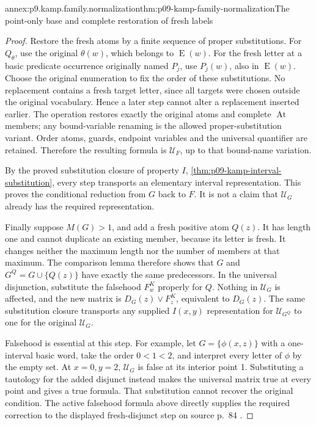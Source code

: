 \begin{annexitem}{annex:p9.kamp.family.normalization}{thm:p09-kamp-family-normalization}{The point-only base and complete restoration of fresh labels}
\begin{proof}
Restore the fresh atoms by a finite sequence of proper substitutions.
For \(Q_\theta\), use the original \(\theta(w)\), which
belongs to \(\operatorname{E}(w)\). For the fresh letter at
a basic predicate occurrence originally named \(P_j\), use
\(P_j(w)\), also in \(\operatorname{E}(w)\). Choose the
original enumeration to fix the order of these substitutions.
No replacement contains a fresh target letter, since all targets were
chosen outside the original vocabulary. Hence a later step cannot
alter a replacement inserted earlier. The operation restores exactly
the original atoms and complete \(\operatorname{At}\) members;
any bound-variable renaming is the allowed proper-substitution variant.
Order atoms, guards, endpoint variables and the universal quantifier
are retained. Therefore the resulting formula is
\(\mathcal U_F\), up to that bound-name variation.

By the proved substitution closure of property \(I\),
\cref{thm:p09-kamp-interval-substitution}, every step transports
an elementary interval representation. This proves the conditional
reduction from \(G\) back to \(F\). It is not a claim that
\(\mathcal U_G\) already has the required representation.

Finally suppose \(M(G)>1\), and add a fresh positive atom \(Q(z)\).
It has length one and cannot duplicate an existing member, because
its letter is fresh. It changes neither the maximum length nor
the number of members at that maximum. The comparison lemma therefore
shows that \(G\) and \(G^Q=G\cup\{Q(z)\}\) have exactly
the same predecessors. In the universal disjunction, substitute
the falsehood \(F^K_w\) properly for \(Q\). Nothing in
\(\mathcal U_G\) is affected, and the new matrix is
\(D_G(z)\lor F^K_z\), equivalent to \(D_G(z)\).
The same substitution closure transports any supplied
\(I(x,y)\) representation for \(\mathcal U_{G^Q}\) to one
for the original \(\mathcal U_G\).

Falsehood is essential at this step. For example, let
\(G=\{\phi(x,z)\}\) with a one-interval basic word,
take the order \(0<1<2\), and interpret every letter of
\(\phi\) by the empty set. At \(x=0,y=2\),
\(\mathcal U_G\) is false at its interior point 1.
Substituting a tautology for the added disjunct instead makes the
universal matrix true at every point and gives a true formula.
That substitution cannot recover the original condition. The active
falsehood formula above directly supplies the required correction
to the displayed fresh-disjunct step on source p.~84
\cite[ch.~III, pp.~83--84]{Kamp1968}.
\end{proof}
\end{annexitem}

